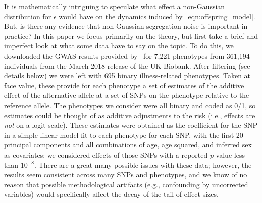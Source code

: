 \documentclass{article}
\theoremstyle{remark}
\theoremstyle{definition}
\begin{document}
It is mathematically intriguing to speculate what effect a non-Gaussian distribution
for $\epsilon$ would have on the dynamics induced by~\eqref{eqn:offspring_model}.
But, is there any evidence that non-Gaussian segregation noise is important in practice?
In this paper we focus primarily on the theory,
but first take a brief and imperfect look at what some data have to say on the topic.
To do this, we downloaded the GWAS results provided by~\citet{biobankSNPs}
for 7,221 phenotypes from 361,194 individuals from the March 2018 release of the UK Biobank.
After filtering (see details below) we were left with 695 binary illness-related phenotypes.
Taken at face value, these provide for each phenotype a set of estimates of the additive effect
of the alternative allele at a set of SNPs on the phenotype relative to the reference allele.
The phenotypes we consider were all binary and coded as 0/1,
so estimates could be thought of as additive adjustments to the risk
(i.e., effects are \emph{not} on a logit scale).
These estimates were obtained as the coefficient for the SNP in a simple linear model
fit to each phenotype for each SNP,
with the first 20 principal components and all combinations of age, age squared, and inferred sex as covariates;
we considered effects of those SNPs with a reported $p$-value less than $10^{-8}$.
There are a great many possible issues with these data;
however, the results seem consistent across many SNPs and phenotypes,
and we know of no reason that possible methodological artifacts
(e.g., confounding by uncorrected variables)
would specifically affect the decay of the tail of effect sizes.
\end{document}
